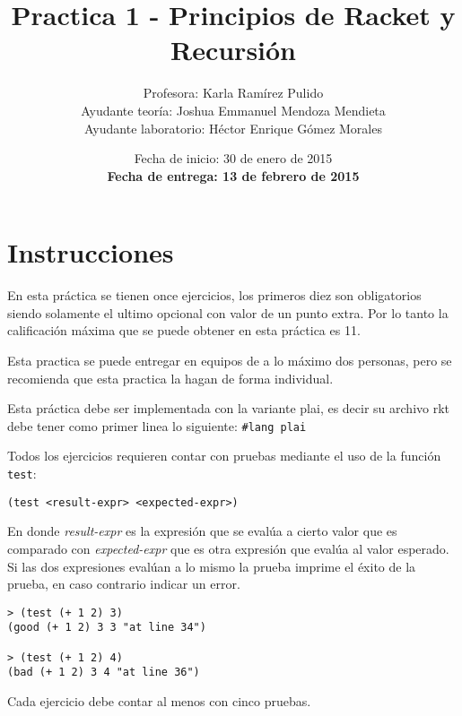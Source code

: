 \documentclass{article}
\author{Profesora: Karla Ramírez Pulido\\
  Ayudante teoría: Joshua Emmanuel Mendoza Mendieta\\
  Ayudante laboratorio: Héctor Enrique Gómez Morales}
\title{Practica 1 - Principios de Racket y Recursión}
\date{Fecha de inicio: 30 de enero de 2015\\
  \textbf{Fecha de entrega: 13 de febrero de 2015}}
\begin{document}
\maketitle
\section{Instrucciones}
En esta práctica se tienen once ejercicios, los primeros diez son
obligatorios siendo solamente el ultimo opcional con valor de un punto
extra. Por lo tanto la calificación máxima que se puede obtener en
esta práctica es 11.

Esta practica se puede entregar en equipos de a lo máximo dos
personas, pero se recomienda que esta practica la hagan de forma
individual.

Esta práctica debe ser implementada con la variante plai, es decir
su archivo rkt debe tener como primer linea lo siguiente:
\texttt{\#lang plai}

Todos los ejercicios requieren contar con pruebas mediante el uso de
la función \texttt{test}:
\begin{verbatim}
(test <result-expr> <expected-expr>)
\end{verbatim}

En donde \textit{result-expr} es la expresión que se evalúa a cierto
valor que es comparado con \textit{expected-expr} que es otra
expresión que evalúa al valor esperado. Si las dos expresiones evalúan
a lo mismo la prueba imprime el éxito de la prueba, en caso contrario
indicar un error.

\begin{verbatim}
> (test (+ 1 2) 3)
(good (+ 1 2) 3 3 "at line 34")

> (test (+ 1 2) 4)
(bad (+ 1 2) 3 4 "at line 36")
\end{verbatim}

Cada ejercicio debe contar al menos con cinco pruebas.
\end{document}
